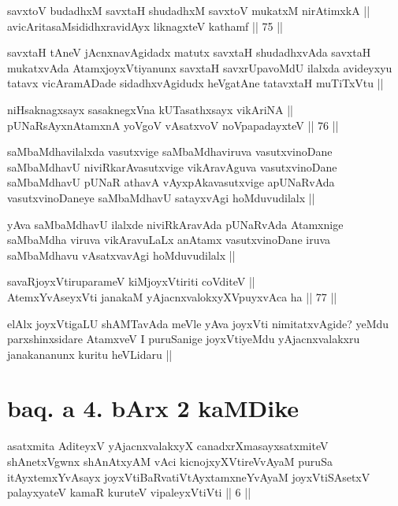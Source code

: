 \begin{shl}
savxtoV budadhxM savxtaH shudadhxM savxtoV mukatxM nirAtimxkA || \\
avicAritasaMsididhxravidAyx liknagxteV kathamf ||  75 ||  
\end{shl}

\begin{artha}
savxtaH tAneV jAcnxnavAgidadx matutx savxtaH shudadhxvAda savxtaH mukatxvAda AtamxjoyxVtiyanunx savxtaH savxrUpavoMdU ilalxda avideyxyu tatavx vicAramADade sidadhxvAgidudx heVgatAne tatavxtaH muTiTxVtu ||
\end{artha}

\begin{shl}
niHsaknagxsayx sasaknegxVna kUTasathxsayx vikAriNA ||  \\
pUNaRsAyxnAtamxnA yoVgoV vAsatxvoV noVpapadayxteV ||  76 ||  
\end{shl}

\begin{artha}
saMbaMdhavilalxda vasutxvige saMbaMdhaviruva vasutxvinoDane saMbaMdhavU niviRkarAvasutxvige vikAravAguva vasutxvinoDane saMbaMdhavU pUNaR athavA vAyxpAkavasutxvige apUNaRvAda vasutxvinoDaneye saMbaMdhavU satayxvAgi hoMduvudilalx || 

yAva saMbaMdhavU ilalxde niviRkAravAda pUNaRvAda Atamxnige saMbaMdha viruva vikAravuLaLx anAtamx vasutxvinoDane iruva saMbaMdhavu vAsatxvavAgi hoMduvudilalx ||
\end{artha}

\begin{shl}
savaRjoyxVtiruparameV kiMjoyxVtiriti coVditeV ||  \\
AtemxYvAseyxVti janakaM yAjacnxvalokxyXV\s puyxvAca ha ||  77 ||  
\end{shl}

\begin{artha}
elAlx joyxVtigaLU shAMTavAda meVle yAva joyxVti nimitatxvAgide? yeMdu parxshinxsidare AtamxveV I puruSanige joyxVtiyeMdu yAjacnxvalakxru janakananunx kuritu heVLidaru ||
\end{artha}

\section*{baq. a 4. bArx 2 kaMDike}

\begin{shl}
asatxmita AditeyxV yAjacnxvalakxyX canadxrXmasayxsatxmiteV shAnetxV\s gwnx shAnAtxyAM vAci kicnojxyXVtireVvAyaM puruSa itAyxtemxYvAsayx joyxVtiBaRvatiVtAyxtamxneYvAyaM joyxVtiSAsetxV palayxyateV kamaR kuruteV vipaleyxVtiVti || 6 ||
\end{shl}


